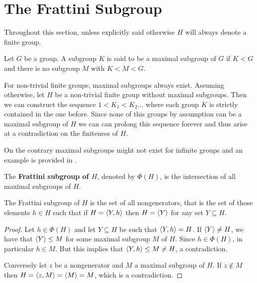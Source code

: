 \section{The Frattini Subgroup}

Throughout this section, unless explicitly said otherwise $H$ will always denote a finite group. 

\begin{definition}
    Let $G$ be a group. A subgroup $K$ is said to be a maximal subgroup of $G$ if $K < G$ and there is no subgroup $M$ with $K < M < G$.
\end{definition}

For non-trivial finite groups, maximal subgroups always exist. Assuming otherwise, let $H$ be a non-trivial finite group without maximal subgroups. Then we can construct the sequence
$1 < K_1 < K_2 ...$
where each group $K$ is strictly contained in the one before. Since none of this groups by assumption can be a maximal subgroup of $H$ we can can prolong this sequence forever and thus arise at a contradiction on the finiteness of $H$.

On the contrary maximal subgroups might not exist for infinite groups and an example is provided in \cite[p.~123]{RotmanITG}.

\begin{definition}
    The \textbf{Frattini subgroup of $H$}, denoted by \textbf{$\Phi(H)$}, is the intersection of all maximal subgroups of $H$. 
\end{definition}

\begin{theorem}
    \cite[p.~123]{RotmanITG}
    The Frattini subgroup of $H$ is the set of all nongenerators, that is the set of those elements $h \in H$ such that if $H = \langle Y, h \rangle$ then $H = \langle Y \rangle$ for any set $Y \subseteq H$.
\end{theorem}

\begin{proof}
    Let $h \in \Phi(H)$ and let $Y \subseteq H$ be such that $\langle Y, h \rangle = H$. If $\langle Y \rangle \ne H$, we have that $\langle Y \rangle \le M$ for some maximal subgroup $M$ of $H$. Since $h \in \Phi(H)$, in particular $h \in M$.  But this implies that $\langle Y,h \rangle \le M \ne H$, a contradiction.

    Conversely let $z$ be a nongenerator and $M$ a maximal subgroup of $H$. If $z \notin M$ then $H = \langle z, M \rangle = \langle M \rangle = M$, which is a contradiction.
\end{proof}

